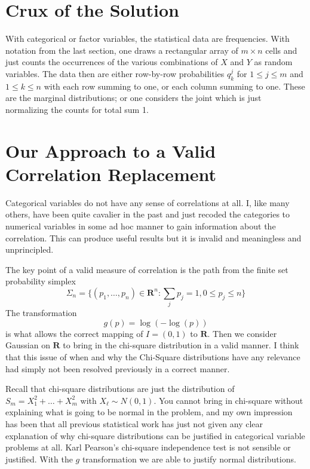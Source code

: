 \documentclass{amsart}
\begin{document}
\section{Crux of the Solution}

With categorical or factor variables, the statistical data are frequencies.  With notation from the last section, one draws a rectangular array of $m \times n$ cells and just counts the occurrences of the various combinations of $X$ and $Y$ as random variables.  The data then are either row-by-row probabilities $q^j_k$ for $1 \le j \le m$ and $1 \le k \le n$ with each row summing to one, or each column summing to one.  These are the marginal distributions; or one considers the joint which is just normalizing the counts for total sum 1.

\section{Our Approach to a Valid Correlation Replacement}

Categorical variables do not have any sense of correlations at all.  I, like many others, have been quite cavalier in the past and just recoded the categories to numerical variables in some ad hoc manner to gain information about the correlation.  This can produce useful results but it is invalid and meaningless and unprincipled.

The key point of a valid measure of correlation is the path from the finite set probability simplex 
\[
\Sigma_n = \{ (p_1, \dots, p_n) \in \mathbf{R}^n: \sum_{j} p_j = 1, 0 \le p_j \le n \}
\]
The transformation 
\[
g(p) = \log( - \log(p))
\]
is what allows the correct mapping of $I=(0,1)$ to $\mathbf{R}$.  Then we consider Gaussian on $\mathbf{R}$ to bring in the chi-square distribution in a valid manner.  I think that this issue of when and why the Chi-Square distributions have any relevance had simply not been resolved previously in a correct manner.

Recall that chi-square distributions are just the distribution of $S_m = X_1^2 + \dots + X_m^2$ with $X_\ell \sim N(0,1)$.  You cannot bring in chi-square without explaining what is going to be normal in the problem, and my own impression has been that all previous statistical work has just not given any clear explanation of why chi-square distributions can be justified in categorical variable problems at all.  Karl Pearson's chi-square independence test is not sensible or justified.  With the $g$ transformation we are able to justify normal distributions.
\end{document}

